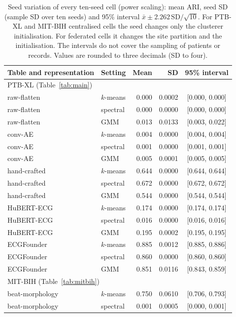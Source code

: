 \documentclass[preprint,11pt]{elsarticle}
\begin{document}
\begin{table}[ht]
\centering
\footnotesize
\caption{Seed variation of every ten-seed cell (power scaling): mean ARI, seed SD
(sample SD over ten seeds) and 95\% interval $\bar{x} \pm 2.262\,\mathrm{SD}/\sqrt{10}$.
For PTB-XL and MIT-BIH centralised cells the seed changes only the clusterer
initialisation. For federated cells it changes the site partition and the initialisation.
The intervals do not cover the sampling of patients or records. Values are rounded to
three decimals (SD to four).}
\label{tab:seedci}
\begin{tabular}{llrrc}
\toprule
Table and representation & Setting & Mean & SD & 95\% interval \\
\midrule
\multicolumn{5}{l}{PTB-XL (Table~\ref{tab:main})} \\
raw-flatten  & $k$-means & 0.000 & 0.0002 & [0.000, 0.000] \\
raw-flatten  & spectral  & 0.000 & 0.0000 & [0.000, 0.000] \\
raw-flatten  & GMM       & 0.013 & 0.0133 & [0.003, 0.022] \\
conv-AE      & $k$-means & 0.004 & 0.0000 & [0.004, 0.004] \\
conv-AE      & spectral  & 0.001 & 0.0000 & [0.001, 0.001] \\
conv-AE      & GMM       & 0.005 & 0.0001 & [0.005, 0.005] \\
hand-crafted & $k$-means & 0.644 & 0.0000 & [0.644, 0.644] \\
hand-crafted & spectral  & 0.672 & 0.0000 & [0.672, 0.672] \\
hand-crafted & GMM       & 0.544 & 0.0000 & [0.544, 0.544] \\
HuBERT-ECG   & $k$-means & 0.174 & 0.0000 & [0.174, 0.174] \\
HuBERT-ECG   & spectral  & 0.016 & 0.0000 & [0.016, 0.016] \\
HuBERT-ECG   & GMM       & 0.195 & 0.0002 & [0.195, 0.195] \\
ECGFounder   & $k$-means & 0.885 & 0.0012 & [0.885, 0.886] \\
ECGFounder   & spectral  & 0.860 & 0.0000 & [0.860, 0.860] \\
ECGFounder   & GMM       & 0.851 & 0.0116 & [0.843, 0.859] \\
\midrule
\multicolumn{5}{l}{MIT-BIH (Table~\ref{tab:mitbih})} \\
beat-morphology & $k$-means & 0.750 & 0.0610 & [0.706, 0.793] \\
beat-morphology & spectral  & 0.001 & 0.0005 & [0.000, 0.001] \\

\end{tabular}
\end{table}
\end{document}
